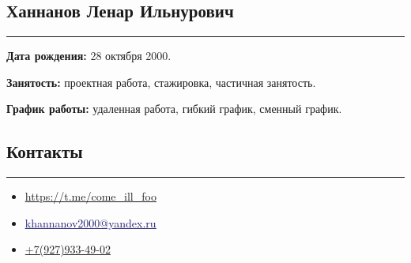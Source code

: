 \documentclass[10pt, final, twoside]{article}
\begin{document}
  \begin{minipage}{0.15\textwidth}\end{minipage}
  \begin{flushright}\section*{\textcolor{darkgray2}{Ханнанов Ленар Ильнурович}}\end{flushright}
  \vspace*{-5.5mm}
  \par\noindent\rule{\textwidth}{0.1pt}
  \textbf{Дата рождения:} 28 октября 2000.
  
  \textbf{Занятость:} проектная работа, стажировка, частичная занятость.
  
  \textbf{График работы:} удаленная работа, гибкий график, сменный график.

  \subsection*{\textcolor{darkgray2}{Контакты}}
  \vspace*{-5.5mm}
  \par\noindent\rule{\textwidth}{0.1pt}
  \begin{itemize}
    \item[\textcolor{MidnightBlue}{\textbullet}] \textcolor{MidnightBlue}{\underline{\url{https://t.me/come_ill_foo}}}
    \item[\textcolor{MidnightBlue}{\textbullet}] \href{mailto:khannanov2000@yandex.ru}{\textcolor{MidnightBlue}{\underline{khannanov2000@yandex.ru}}}
    \item[\textcolor{MidnightBlue}{\textbullet}] \href{tel:79279334902}{+7(927)933-49-02}
  \end{itemize}
\end{document}
